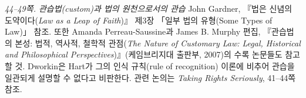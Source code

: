 \documentclass[12pt, oneside]{book}  %
\begin{document}
\emph{44--49쪽. 관습법(custom)과 법의 원천으로서의 관습} John Gardner,
『법은 신념의 도약이다(\emph{Law as a Leap of Faith})』 제3장 「일부
법의 유형(Some Types of Law)」 참조. 또한 Amanda Perreau-Saussine과
James B. Murphy 편집, 『관습법의 본성: 법적, 역사적, 철학적
관점(\emph{The Nature of Customary Law: Legal, Historical and
Philosophical Perspectives})』(케임브리지대 출판부, 2007)의 수록
논문들도 참고할 것. Dworkin은 Hart가 그의 인식 규칙(rule of recognition)
이론에 비추어 관습을 일관되게 설명할 수 없다고 비판한다. 관련 논의는
\emph{Taking Rights Seriously}, 41--44쪽 참조.
\end{document}
